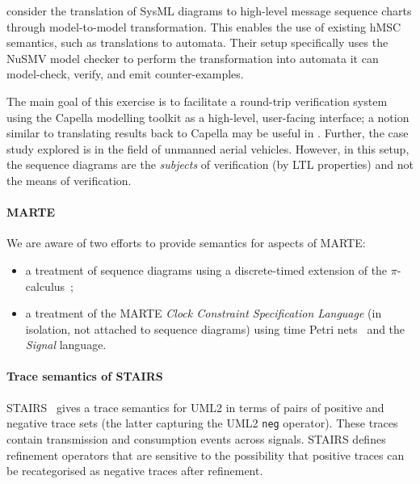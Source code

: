 \textcite{Busard21-SDviaHMSC} consider the translation of SysML diagrams to high-level message sequence
charts through model-to-model transformation.  This enables
the use of existing hMSC semantics, such as translations to
automata.  Their setup specifically uses the NuSMV model
checker to perform the transformation into automata it can
model-check, verify, and emit counter-examples.

The main goal of this exercise is to facilitate a round-trip
verification system using the Capella modelling toolkit as a
high-level, user-facing interface; a notion similar to translating results
back to Capella may be useful in \langname.  Further, the case study explored is
in the field of unmanned aerial vehicles.
However, in this setup, the
sequence diagrams are the \emph{subjects} of verification (by LTL properties)
and not the means of verification.

\paragraph{MARTE}

We are aware of two efforts to provide semantics for aspects of MARTE:

\begin{itemize}
  \item
    a treatment of sequence diagrams using a discrete-timed extension of
    the \(\pi\)-calculus~\cite{Jin11-MARTEPiCalculus}; 
  \item 
    a treatment of the MARTE \emph{Clock Constraint Specification Language} (in
    isolation, not attached to sequence diagrams) using time Petri
    nets~\cite{Mallet09-MARTEClockNets} and the \emph{Signal} language.
\end{itemize}

\paragraph{Trace semantics of STAIRS}

STAIRS~\cite{Haugen03-STAIRS} gives a trace semantics for UML2 in terms
of pairs of positive and negative trace sets (the latter capturing the UML2
\texttt{neg} operator).  These traces contain
transmission and consumption events across signals.  STAIRS defines
refinement operators that are sensitive to the possibility that positive
traces can be recategorised as negative traces after refinement.

